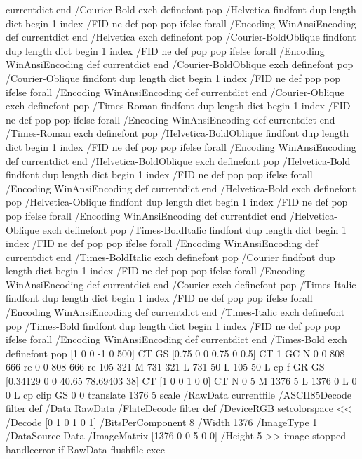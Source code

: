   currentdict
end
/Courier-Bold exch definefont pop
/Helvetica findfont
dup length dict begin
  {1 index /FID ne {def} {pop pop} ifelse} forall
  /Encoding WinAnsiEncoding def
  currentdict
end
/Helvetica exch definefont pop
/Courier-BoldOblique findfont
dup length dict begin
  {1 index /FID ne {def} {pop pop} ifelse} forall
  /Encoding WinAnsiEncoding def
  currentdict
end
/Courier-BoldOblique exch definefont pop
/Courier-Oblique findfont
dup length dict begin
  {1 index /FID ne {def} {pop pop} ifelse} forall
  /Encoding WinAnsiEncoding def
  currentdict
end
/Courier-Oblique exch definefont pop
/Times-Roman findfont
dup length dict begin
  {1 index /FID ne {def} {pop pop} ifelse} forall
  /Encoding WinAnsiEncoding def
  currentdict
end
/Times-Roman exch definefont pop
/Helvetica-BoldOblique findfont
dup length dict begin
  {1 index /FID ne {def} {pop pop} ifelse} forall
  /Encoding WinAnsiEncoding def
  currentdict
end
/Helvetica-BoldOblique exch definefont pop
/Helvetica-Bold findfont
dup length dict begin
  {1 index /FID ne {def} {pop pop} ifelse} forall
  /Encoding WinAnsiEncoding def
  currentdict
end
/Helvetica-Bold exch definefont pop
/Helvetica-Oblique findfont
dup length dict begin
  {1 index /FID ne {def} {pop pop} ifelse} forall
  /Encoding WinAnsiEncoding def
  currentdict
end
/Helvetica-Oblique exch definefont pop
/Times-BoldItalic findfont
dup length dict begin
  {1 index /FID ne {def} {pop pop} ifelse} forall
  /Encoding WinAnsiEncoding def
  currentdict
end
/Times-BoldItalic exch definefont pop
/Courier findfont
dup length dict begin
  {1 index /FID ne {def} {pop pop} ifelse} forall
  /Encoding WinAnsiEncoding def
  currentdict
end
/Courier exch definefont pop
/Times-Italic findfont
dup length dict begin
  {1 index /FID ne {def} {pop pop} ifelse} forall
  /Encoding WinAnsiEncoding def
  currentdict
end
/Times-Italic exch definefont pop
/Times-Bold findfont
dup length dict begin
  {1 index /FID ne {def} {pop pop} ifelse} forall
  /Encoding WinAnsiEncoding def
  currentdict
end
/Times-Bold exch definefont pop
[1 0 0 -1 0 500] CT
GS
[0.75 0 0 0.75 0 0.5] CT
1 GC
N
0 0 808 666 re
0 0 808 666 re
105 321 M
731 321 L
731 50 L
105 50 L
cp
f
GR
GS
[0.34129 0 0 40.65 78.69403 38] CT
[1 0 0 1 0 0] CT
N
0 5 M 1376 5 L 1376 0 L 0 0 L cp
clip
GS
0 0 translate
1376 5 scale
{{
/RawData currentfile /ASCII85Decode filter def
/Data RawData /FlateDecode filter def
/DeviceRGB setcolorspace
<<
  /Decode [0 1 0 1 0 1]
  /BitsPerComponent 8
  /Width 1376
  /ImageType 1
  /DataSource Data
  /ImageMatrix [1376 0 0 5 0 0]
  /Height 5
>> image
} stopped {handleerror} if
  RawData flushfile
} exec
